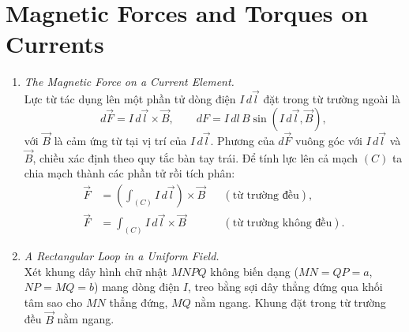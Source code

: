 \section{Magnetic Forces and Torques on Currents}
\begin{enumerate}
\item \textit{The Magnetic Force on a Current Element.}\\
Lực từ tác dụng lên một phần tử dòng điện $I\,d\vec{l}$ đặt trong từ trường ngoài là
\[
d\vec{F} = I\,d\vec{l} \times \vec{B},
\qquad
dF = I\,dl\,B\sin(I\,d\vec{l},\vec{B}),
\]
với $\vec{B}$ là cảm ứng từ tại vị trí của $I\,d\vec{l}$. Phương của $d\vec{F}$ vuông góc với $I\,d\vec{l}$ và $\vec{B}$, chiều xác định theo quy tắc bàn tay trái. Để tính lực lên cả mạch $(C)$ ta chia mạch thành các phần tử rồi tích phân:
\begin{align*}
\vec{F} &= \left(\int_{(C)} I\,d\vec{l}\right) \times \vec{B} && (\text{từ trường đều}),\\
\vec{F} &= \int_{(C)} I\,d\vec{l} \times \vec{B} && (\text{từ trường không đều}).
\end{align*}

\item \textit{A Rectangular Loop in a Uniform Field.}\\
Xét khung dây hình chữ nhật $MNPQ$ không biến dạng ($MN = QP = a$, $NP = MQ = b$) mang dòng điện $I$, treo bằng sợi dây thẳng đứng qua khối tâm sao cho $MN$ thẳng đứng, $MQ$ nằm ngang. Khung đặt trong từ trường đều $\vec{B}$ nằm ngang.


\end{enumerate}
